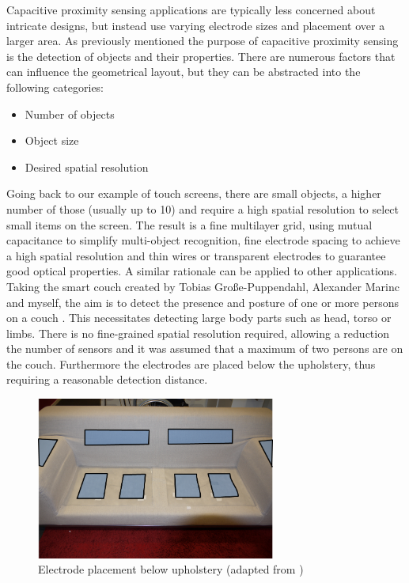 Capacitive proximity sensing applications are typically less concerned about intricate designs, but instead use varying electrode sizes and placement over a larger area. As previously mentioned the purpose of capacitive proximity sensing is the detection of objects and their properties. There are numerous factors that can influence the geometrical layout, but they can be abstracted into the following categories:
\begin{itemize}
\item	Number of objects
\item	Object size
\item	Desired spatial resolution
\end{itemize}
Going back to our example of touch screens, there are small objects, a higher number of those (usually up to 10) and require a high spatial resolution to select small items on the screen. The result is a fine multilayer grid, using mutual capacitance to simplify multi-object recognition, fine electrode spacing to achieve a high spatial resolution and thin wires or transparent electrodes to guarantee good optical properties. A similar rationale can be applied to other applications. Taking the smart couch created by Tobias Große-Puppendahl, Alexander Marinc and myself, the aim is to detect the presence and posture of one or more persons on a couch \cite{Couch2011}. This necessitates detecting large body parts such as head, torso or limbs. There is no fine-grained spatial resolution required, allowing a reduction the number of sensors and it was assumed that a maximum of two persons are on the couch. Furthermore the electrodes are placed below the upholstery, thus requiring a reasonable detection distance. 
\begin{figure} [h]
\centering
\includegraphics[width=0.7\textwidth]{images/couch_electrodes.png} 
\caption{Electrode placement below upholstery (adapted from \cite{Couch2011})}
\label{fig:couch_electrodes}
\end{figure}
